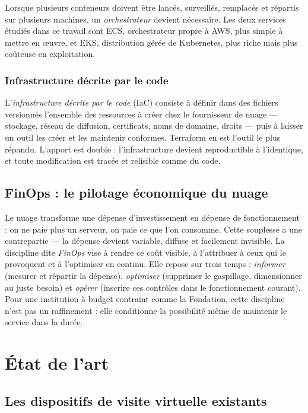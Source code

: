 Lorsque plusieurs conteneurs doivent être lancés, surveillés, remplacés et
répartis sur plusieurs machines, un \emph{orchestrateur} devient nécessaire. Les
deux services étudiés dans ce travail sont ECS, orchestrateur propre à AWS, plus
simple à mettre en œuvre, et EKS, distribution gérée de Kubernetes, plus riche
mais plus coûteuse en exploitation.

\subsubsection{Infrastructure décrite par le code}

L'\emph{infrastructure décrite par le code} (IaC) consiste à définir dans des
fichiers versionnés l'ensemble des ressources à créer chez le fournisseur de
nuage — stockage, réseau de diffusion, certificats, noms de domaine, droits —
puis à laisser un outil les créer et les maintenir conformes. Terraform en est
l'outil le plus répandu. L'apport est double : l'infrastructure devient
reproductible à l'identique, et toute modification est tracée et relisible comme
du code.

\subsection{FinOps : le pilotage économique du nuage}

Le nuage transforme une dépense d'investissement en dépense de fonctionnement :
on ne paie plus un serveur, on paie ce que l'on consomme. Cette souplesse a une
contrepartie — la dépense devient variable, diffuse et facilement invisible. La
discipline dite \emph{FinOps} vise à rendre ce coût visible, à l'attribuer à
ceux qui le provoquent et à l'optimiser en continu. Elle repose sur trois
temps : \emph{informer} (mesurer et répartir la dépense), \emph{optimiser}
(supprimer le gaspillage, dimensionner au juste besoin) et \emph{opérer}
(inscrire ces contrôles dans le fonctionnement courant). Pour une institution à
budget contraint comme la Fondation, cette discipline n'est pas un raffinement :
elle conditionne la possibilité même de maintenir le service dans la durée.

\section{État de l'art}
\label{sec:etatart}

\subsection{Les dispositifs de visite virtuelle existants}

